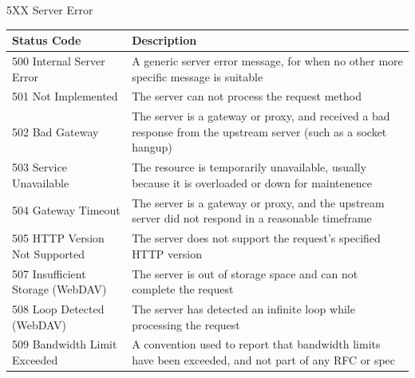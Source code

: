 \documentclass[final]{beamer}
\begin{document}
\begin{frame}{}
\begin{block}{\huge 5XX Server Error}
      \begin{tabular}{p{} p{}}
        Status Code & Description \\ \hline
        500 Internal Server Error & A generic server error message, for when no other more specific message is suitable \\
        501 Not Implemented & The server can not process the request method \\
        502 Bad Gateway & The server is a gateway or proxy, and received a bad response from the upstream server (such as a socket hangup) \\
        503 Service Unavailable & The resource is temporarily unavailable, usually because it is overloaded or down for maintenence \\
        504 Gateway Timeout & The server is a gateway or proxy, and the upstream server did not respond in a reasonable timeframe \\
        505 HTTP Version Not Supported & The server does not support the request's specified HTTP version \\
        507 Insufficient Storage (WebDAV) & The server is out of storage space and can not complete the request \\
        508 Loop Detected (WebDAV) & The server has detected an infinite loop while processing the request \\
        509 Bandwidth Limit Exceeded & A convention used to report that bandwidth limits have been exceeded, and not part of any RFC or spec \\
      \end{tabular}
    \end{block}
  \end{frame}
\end{document}
